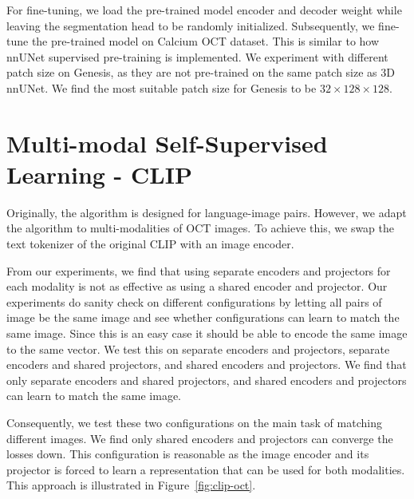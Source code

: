 \documentclass[a4paper,11pt,oneside]{report}
\begin{document}
For fine-tuning, we load the pre-trained model encoder and decoder weight while leaving the segmentation head to be randomly initialized. Subsequently, we fine-tune the pre-trained model on Calcium OCT dataset. This is similar to how nnUNet supervised pre-training is implemented. We experiment with different patch size on Genesis, as they are not pre-trained on the same patch size as 3D nnUNet. We find the most suitable patch size for Genesis to be $32\times 128\times 128$.

\section{Multi-modal Self-Supervised Learning - CLIP}\label{sec:implementation:clip}
Originally, the algorithm is designed for language-image pairs. However, we adapt the algorithm to multi-modalities of OCT images. To achieve this, we swap the text tokenizer of the original CLIP with an image encoder. 

From our experiments, we find that using separate encoders and projectors for each modality is not as effective as using a shared encoder and projector. Our experiments do sanity check on different configurations by letting all pairs of image be the same image and see whether configurations can learn to match the same image. Since this is an easy case it should be able to encode the same image to the same vector. We test this on separate encoders and projectors, separate encoders and shared projectors, and shared encoders and projectors. We find that only separate encoders and shared projectors, and shared encoders and projectors can learn to match the same image. 

Consequently, we test these two configurations on the main task of matching different images. We find only shared encoders and projectors can converge the losses down. This configuration is reasonable as the image encoder and its projector is forced to learn a representation that can be used for both modalities. This approach is illustrated in Figure~\ref{fig:clip-oct}.
\end{document}
